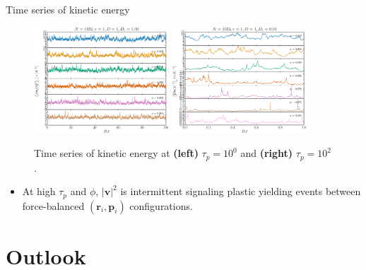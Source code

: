 \documentclass{beamer}
\begin{document}
\begin{frame}{Time series of kinetic energy}

\begin{figure}
\centering
\includegraphics[width=0.45\textwidth]{No1024_Fl1000_Vl0000_Tl1000_Rl1000.ecC.eps}
\includegraphics[width=0.45\textwidth]{No1024_Fl1000_Vl0000_Tl1000_Rj1000.ecC.eps}
\caption{Time series of kinetic energy at {\bf (left)} $\tau_p = 10^0$ and {\bf (right)} $\tau_p = 10^2$.}
\end{figure}

\begin{itemize}
  \item At high $\tau_p$ and $\phi$, $|\boldsymbol{v}|^2$ is intermittent signaling plastic yielding events between force-balanced $(\boldsymbol{r}_i, \boldsymbol{p}_i)$ configurations.
\end{itemize}


\end{frame}

\section{Outlook}
\end{document}
